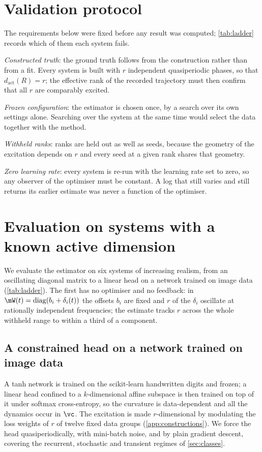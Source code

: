 \documentclass{article}
\begin{document}
\section{Validation protocol}\label{sec:protocol}

The requirements below were fixed before any result was computed; \cref{tab:ladder} records which
of them each system fails.

\emph{Constructed truth}: the ground truth follows from the construction rather than from a fit.
Every system is built with $r$ independent quasiperiodic phases, so that $d_{\mathrm{act}}(R) = r$;
the effective rank of the recorded trajectory must then confirm that all $r$ are comparably
excited.

\emph{Frozen configuration}: the estimator is chosen once, by a search over its own settings alone.
Searching over the system at the same time would select the data together with the
method.

\emph{Withheld ranks}: ranks are held out as well as seeds, because the geometry of the excitation
depends on $r$ and every seed at a given rank shares that geometry.

\emph{Zero learning rate}: every system is re-run with the learning rate set to zero, so any
observer of the optimiser must be constant. A log that still varies
and still returns its earlier estimate was never a function of the optimiser.

\section{Evaluation on systems with a known active dimension}\label{sec:ladder}

We evaluate the estimator on six systems of increasing realism, from an oscillating diagonal matrix
to a linear head on a network trained on image data (\cref{tab:ladder}).\label{sec:matrix} The
first has no optimiser and no feedback: in $\mW(t) = \operatorname{diag}(b_i + \delta_i(t))$ the
offsets $b_i$ are fixed and $r$ of the $\delta_i$ oscillate at rationally independent frequencies;
the estimate tracks $r$ across the whole withheld range to within a third of a component.

\subsection{A constrained head on a network trained on image data}\label{sec:digits}

A tanh network is trained on the scikit-learn handwritten digits and frozen; a linear head
confined to a $k$-dimensional affine subspace is then trained on top of it under softmax
cross-entropy, so the curvature is data-dependent and all the dynamics occur in $\vc$. The
excitation is made $r$-dimensional by modulating the loss weights of $r$ of twelve fixed data
groups (\cref{app:constructions}). We force
the head quasiperiodically, with mini-batch noise, and by plain gradient descent, covering the
recurrent, stochastic and transient regimes of \cref{sec:classes}.
\end{document}
